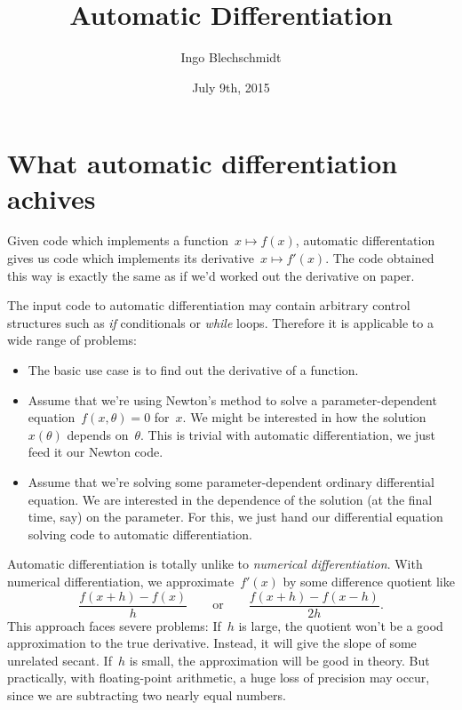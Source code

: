 \documentclass[a4paper,ngerman,12pt]{scrartcl}
\theoremstyle{definition}
\theoremstyle{plain}
\theoremstyle{remark}
\begin{document}
\title{Automatic Differentiation}
\author{Ingo Blechschmidt}
\date{July 9th, 2015}
\maketitle

\section{What automatic differentiation achives}

Given code which implements a function~$x \mapsto f(x)$, automatic
differentation gives us code which implements its derivative~$x \mapsto
f'(x)$. The code obtained this way is exactly the same as if we'd worked out
the derivative on paper.

The input code to automatic differentiation may contain arbitrary control
structures such as \emph{if} conditionals or \emph{while} loops. Therefore it
is applicable to a wide range of problems:

\begin{itemize}
\item The basic use case is to find out the derivative of a function.
\item Assume that we're using Newton's method to solve a parameter-dependent
equation~$f(x,\theta) = 0$ for~$x$. We might be interested in how the
solution~$x(\theta)$ depends on~$\theta$. This is trivial with automatic
differentiation, we just feed it our Newton code.
\item Assume that we're solving some parameter-dependent ordinary differential
equation. We are interested in the dependence of the solution (at the final
time, say) on the parameter. For this, we just hand our differential equation
solving code to automatic differentiation.
\end{itemize}

Automatic differentiation is totally unlike to \emph{numerical
differentiation}. With numerical differentiation, we approximate~$f'(x)$ by
some difference quotient like
\[ \frac{f(x + h) - f(x)}{h} \qquad\text{or}\qquad
  \frac{f(x + h) - f(x - h)}{2h}. \]
This approach faces severe problems: If~$h$ is large, the quotient won't be a
good approximation to the true derivative. Instead, it will give the slope of
some unrelated secant. If~$h$ is small, the approximation will be good in
theory. But practically, with floating-point arithmetic, a huge loss of
precision may occur, since we are subtracting two nearly equal numbers.
\end{document}
